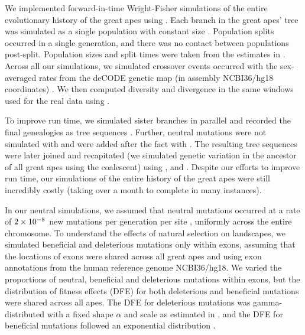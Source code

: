 We implemented forward-in-time Wright-Fisher simulations of the entire evolutionary history of the great apes using \slim \citep{haller_slim_2019, haller_tree-sequence_2019}.
Each branch in the great apes' tree was simulated as a single population with constant size .
Population splits occurred in a single generation, 
and there was no contact between populations post-split.
Population sizes and split times were taken from the estimates in \citet{prado-martinez_great_2013}.
Across all our simulations, we simulated crossover events occurred with the sex-averaged rates from the deCODE genetic map (in assembly NCBI36/hg18 coordinates) \citep{kong_high-resolution_2002}.
We then computed diversity and divergence in the same windows used for the real data using \tskit \citep{kelleher_efficient_2018, ralph_efficiently_2020}.

To improve run time, we simulated sister branches in parallel and recorded the final genealogies as tree sequences \citep{kelleher_efficient_2016}.
Further, neutral mutations were not simulated with \slim and were added after the fact with \msprime.
The resulting tree sequences were later joined and recapitated (\ie we simulated genetic variation in the ancestor of all great apes using the coalescent) using \msprime, \tskit and \pyslim \citep{kelleher_efficient_2016, kelleher_efficient_2018, rodrigues_vignette_2021}.
Despite our efforts to improve run time, our simulations of the entire history of the great apes were still incredibly costly (taking over a month to complete in many instances).

In our neutral simulations, we assumed that neutral mutations occurred at a rate of ${2}\times10^{-8}$ new mutations per generation per site \citep{scally_revising_2012}, uniformly across the entire chromosome.
To understand the effects of natural selection on landscapes, we simulated beneficial and deleterious mutations only within exons,
assuming that the locations of exons were shared across all great apes \citep{kronenberg_high-resolution_2018} and using exon annotations from the human reference genome NCBI36/hg18.
We varied the proportions of neutral, beneficial and deleterious mutations within exons, 
but the distribution of fitness effects (DFE) for both deleterious and beneficial mutations were shared across all apes.
The DFE for deleterious mutations was gamma-distributed with a fixed shape $\alpha$ and scale as estimated in \citet{castellano_comparison_2019},
and the DFE for beneficial mutations followed an exponential distribution \citep{orr_distribution_2003}.

